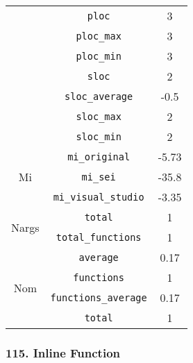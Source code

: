 \begin{center}
\begin{tabular}{ |c|c|c| }
          & \verb|ploc|                           & 3          \\
          & \verb|ploc_max|                       & 3          \\
          & \verb|ploc_min|                       & 3          \\
          & \verb|sloc|                           & 2          \\
          & \verb|sloc_average|                   & -0.5       \\
          & \verb|sloc_max|                       & 2          \\
          & \verb|sloc_min|                       & 2          \\
    \hline
    \multirow{ 3 }{6em}{ Mi }
          & \verb|mi_original|                    & -5.73      \\
          & \verb|mi_sei|                         & -35.8      \\
          & \verb|mi_visual_studio|               & -3.35      \\
    \hline
    \multirow{ 2 }{6em}{ Nargs }
          & \verb|total|                          & 1          \\
          & \verb|total_functions|                & 1          \\
    \hline
    \multirow{ 4 }{6em}{ Nom }
          & \verb|average|                        & 0.17       \\
          & \verb|functions|                      & 1          \\
          & \verb|functions_average|              & 0.17       \\
          & \verb|total|                          & 1          \\
    \hline
  \end{tabular}
\end{center}
\subsubsection{ 115. Inline Function }

